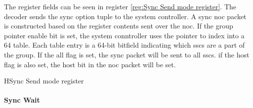 The register fields can be seen in register \ref{reg:Sync Send mode register}.
The decoder sends the sync option tuple to the system controller.
A sync \ac{noc} packet is constructed based on the register contents sent over the \ac{noc}.
If the group pointer enable bit is set, the system conntroller uses the pointer to index into a 64 table. 
Each table entry is a 64-bit bitfield indicating which \acp{ssc} are a part of the group.
If the all flag is set, the sync packet will be sent to all \acp{ssc}.
if the host flag is also set, the host bit in the \ac{noc} packet will be set.
\begin{register}{H}{Sync Send mode register}{}%
  \label{reg:Sync Send mode register}
  \vspace{-20pt}
\end{register}

\paragraph{Sync Wait}

